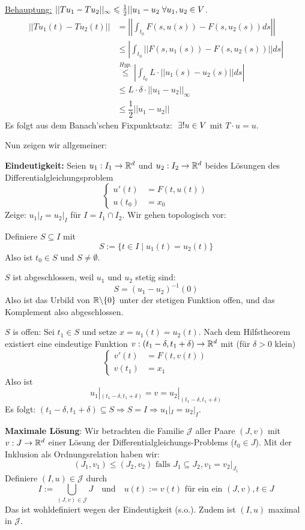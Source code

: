 \documentclass[main.tex]{subfiles}
\begin{document}
\begin{Beweis}
\begin{Beweis}
    \underline{Behauptung:} $||T u_1 - T u_2 ||_\infty \leqslant \frac{1}{2}||u_1 - u_2 \;\forall u_1,u_2 \in V$.
    $$\begin{aligned}
      ||Tu_1(t) - Tu_2(t)|| & = \left|\left| \int_{t_0} F(s, u(s)) - F(s,u_2(s)) ds \right|\right| \\
      & \leq \left| \int_{t_0} ||F(s, u_1(s)) - F(s,u_2(s))|| ds \right| \\
      & \stackrel{Hyp.}{\leq} \left| \int_{t_0} L \cdot ||u_1(s) - u_2(s)|| ds \right| \\
      & \leq L \cdot \delta \cdot ||u_1 - u_2||_\infty \\
      & \leq \dfrac{1}{2} ||u_1 - u_2||
    \end{aligned}$$
    Es folgt aus dem Banach'schen Fixpunktsatz: $\;\exists! u \in V$ mit $T \cdot u = u$.
  \end{Beweis}

  Nun zeigen wir allgemeiner:

  \textbf{Eindeutigkeit:} Seien $u_1 : I_1 \to \mathbb{R}^d$ und $u_2 : I_2 \to \mathbb{R}^d$ beides Lösungen des Differentialgleichungsproblem
  $$\left\{\begin{aligned}
    u'(t) & = F(t,u(t)) \\
    u(t_0) & = x_0
  \end{aligned}\right.$$
  Zeige: $u_1 |_I = u_2 |_I$ für $I = I_1 \cap I_2$. Wir gehen topologisch vor:

  Definiere $S \subseteq I$ mit
  $$S := \{t \in I \mid u_1(t) = u_2(t)\}$$
  Also ist $t_0 \in S$ und $S \neq \emptyset$.

  $S$ ist abgeschlossen, weil $u_1$ und $u_2$ stetig sind:
  $$S = (u_1 - u_2)^{-1}(0)$$
  Also ist das Urbild von $\mathbb{R} \backslash \{0\}$ unter der stetigen Funktion offen, und das Komplement also abgeschlossen.

  $S$ is offen: Sei $t_1 \in S$ und setze $x = u_1(t) = u_2(t)$. Nach dem Hilfstheorem existiert eine eindeutige Funktion
  $v: (t_1 - \delta, t_1 + \delta) \to \mathbb{R}^d$ mit (für $\delta > 0$ klein)
  $$\left\{\begin{aligned}
    v'(t) & = F(t,v(t)) \\
    v(t_1) & = x_1
  \end{aligned}\right.$$
  Also ist
  $$u_1 |_{(t_1 - \delta,t_1 +\delta)} = v = u_2 |_{(t_1 - \delta,t_1 +\delta)}$$
  Es folgt: $(t_1 - \delta,t_1 +\delta) \subseteq S \Rightarrow S = I \Rightarrow u_1 |_I = u_2 |_I$.


  \textbf{Maximale Lösung}: Wir betrachten die Familie $\mathcal{J}$ aller Paare $(J,v)$ mit $v: J \to \mathbb{R}^d$ einer Lösung der Differentialgleichungs-Problems ($t_0 \in J$). Mit der Inklusion als Ordnungsrelation haben wir:
  $$(J_1, v_1) \leq (J_2,v_2) \text{ falls } J_1 \subseteq J_2, v_1 = v_2 |_{J_1}$$
  Definiere $(I,u) \in \mathcal{J}$ durch
  $$I := \bigcup_{(J,v) \in \mathcal{J}} J \quad \text{und} \quad u(t) := v(t) \text{ für ein ein } (J,v), t \in J$$
  Das ist wohldefiniert wegen der Eindeutigkeit (s.o.). Zudem ist $(I,u)$ maximal in $\mathcal{J}$.


\end{Beweis}
\end{document}
